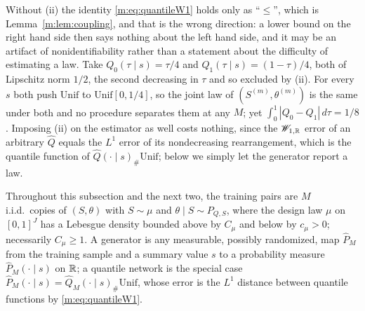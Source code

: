 \begin{remark}\label{m:rem:mono}
Without (ii) the identity \eqref{m:eq:quantileW1} holds only as ``$\le$'', which is Lemma~\ref{m:lem:coupling}, and that is the wrong direction: a lower bound on the right hand side then says nothing about the left hand side, and it may be an artifact of nonidentifiability rather than a statement about the difficulty of estimating a law. Take $Q_0(\tau\mid s)=\tau/4$ and $Q_1(\tau\mid s)=(1-\tau)/4$, both of Lipschitz norm $1/2$, the second decreasing in $\tau$ and so excluded by (ii). For every $s$ both push $\mathrm{Unif}$ to $\mathrm{Unif}[0,1/4]$, so the joint law of $(S^{(m)},\theta^{(m)})$ is the same under both and no procedure separates them at any $M$; yet $\int_0^1|Q_0-Q_1|\,d\tau=1/8$. Imposing (ii) on the estimator as well costs nothing, since the $\mathscr{W}_{1,\mathbb{R}}$ error of an arbitrary $\hat Q$ equals the $L^1$ error of its nondecreasing rearrangement, which is the quantile function of $\hat Q(\cdot\mid s)_\#\mathrm{Unif}$; below we simply let the generator report a law.
\end{remark}

Throughout this subsection and the next two, the training pairs are $M$ i.i.d.\ copies of $(S,\theta)$ with $S\sim\mu$ and $\theta\mid S\sim P_{Q,S}$, where the design law $\mu$ on $[0,1]^J$ has a Lebesgue density bounded above by $C_\mu$ and below by $c_\mu>0$; necessarily $C_\mu\ge1$. A generator is any measurable, possibly randomized, map $\hat P_M$ from the training sample and a summary value $s$ to a probability measure $\hat P_M(\cdot\mid s)$ on $\mathbb{R}$; a quantile network is the special case $\hat P_M(\cdot\mid s)=\hat Q_M(\cdot\mid s)_\#\mathrm{Unif}$, whose error is the $L^1$ distance between quantile functions by \eqref{m:eq:quantileW1}.

